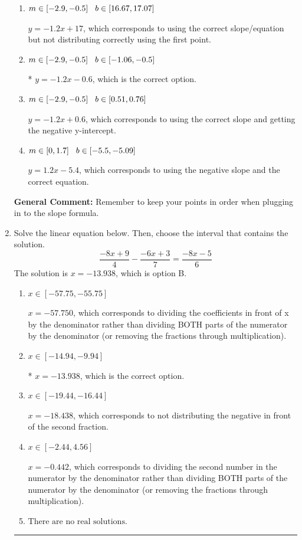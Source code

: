 \documentclass{extbook}[14pt]
\newcommand{\litem}[1]{\item #1

\rule{\textwidth}{0.4pt}}
\begin{document}
\begin{enumerate}
{\begin{enumerate}[label=\Alph*.]
 $y = -1.2x -5$, which corresponds to using the correct slope/equation but not distributing correctly using the second point.
\item \( m \in [-2.9, -0.5] \hspace*{3mm} b \in [16.67, 17.07] \)

 $y = -1.2x + 17$, which corresponds to using the correct slope/equation but not distributing correctly using the first point.
\item \( m \in [-2.9, -0.5] \hspace*{3mm} b \in [-1.06, -0.5] \)

* $y = -1.2x -0.6$, which is the correct option.
\item \( m \in [-2.9, -0.5] \hspace*{3mm} b \in [0.51, 0.76] \)

 $y = -1.2x + 0.6$, which corresponds to using the correct slope and getting the negative y-intercept.
\item \( m \in [0, 1.7] \hspace*{3mm} b \in [-5.5, -5.09] \)

 $y = 1.2x -5.4$, which corresponds to using the negative slope and the correct equation.
\end{enumerate}

\textbf{General Comment:} Remember to keep your points in order when plugging in to the slope formula.
}
\litem{
Solve the linear equation below. Then, choose the interval that contains the solution.
\[ \frac{-8x + 9}{4} - \frac{-6x + 3}{7} = \frac{-8x -5}{6} \]The solution is \( x = -13.938 \), which is option B.\begin{enumerate}[label=\Alph*.]
\item \( x \in [-57.75, -55.75] \)

 $x = -57.750$, which corresponds to dividing the coefficients in front of x by the denominator rather than dividing BOTH parts of the numerator by the denominator (or removing the fractions through multiplication).
\item \( x \in [-14.94, -9.94] \)

* $x = -13.938$, which is the correct option.
\item \( x \in [-19.44, -16.44] \)

 $x = -18.438$, which corresponds to not distributing the negative in front of the second fraction.
\item \( x \in [-2.44, 4.56] \)

 $x = -0.442$, which corresponds to dividing the second number in the numerator by the denominator rather than dividing BOTH parts of the numerator by the denominator (or removing the fractions through multiplication).
\item \( \text{There are no real solutions.} \)


\end{enumerate}}
\end{enumerate}
\end{document}
